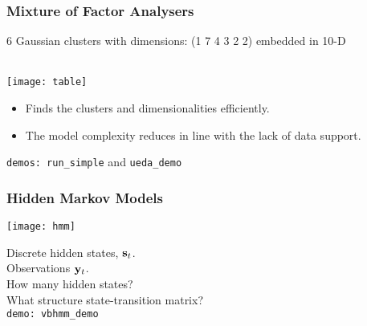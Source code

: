\begin{frame}

\frametitle{Mixture of Factor Analysers}

 6 Gaussian clusters with dimensions: (1 7 4 3 2 2)
embedded in 10-D \\[1ex]

\\[1ex]
\centerline{\texttt{[image: table]}}

\begin{itemize}
\item Finds the clusters and dimensionalities efficiently.
      \item The model complexity reduces in line with the lack of data
support.   
\end{itemize}

{\tt demos: run\_simple} and {\tt ueda\_demo}

\end{frame}
\begin{frame}
\frametitle{Hidden Markov Models}

\centerline{\texttt{[image: hmm]}} 

\vspace*{1ex}

Discrete hidden states, $\mathbf s_t$.\\

Observations $\mathbf{y}_t$. \\[2ex]

How many hidden states? \\
What structure state-transition matrix?\\[2ex]

{\tt demo: vbhmm\_demo}
\end{frame}
